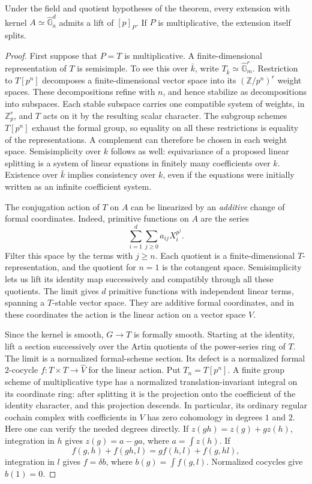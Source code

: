\begin{lemma}
\label{C:formal-vector-splitting}
Under the field and quotient hypotheses of the theorem, every extension
with kernel $A\simeq\widehat{\mathbb G}_a^d$ admits a lift of $[p]_P$.
If $P$ is multiplicative, the extension itself splits.
\end{lemma}
\begin{proof}
First suppose that $P=T$ is multiplicative.  A finite-dimensional
representation of $T$ is semisimple.  To see this over $\bar k$, write
$T_{\bar k}\simeq\widehat{\mathbb G}_m^r$.  Restriction to
$T[p^n]$ decomposes a finite-dimensional vector space into its
$(\mathbb Z/p^n)^r$ weight spaces.  These decompositions refine with
$n$, and hence stabilize as decompositions into subspaces.  Each
stable subspace carries one compatible system of weights, in
$\mathbb Z_p^r$, and $T$ acts on it by the resulting scalar character.
The subgroup schemes $T[p^n]$ exhaust the formal group, so equality on
all these restrictions is equality of the representations.  A
complement can therefore be chosen in each weight space.  Semisimplicity
over $k$ follows as well: equivariance of a proposed linear splitting
is a system of linear equations in finitely many coefficients over
$k$.  Existence over $\bar k$ implies consistency over $k$, even if the
equations were initially written as an infinite coefficient system.

The conjugation action of $T$ on $A$ can be linearized by an
\emph{additive} change of formal coordinates.  Indeed, primitive
functions on $A$ are the series
\[
  \sum_{i=1}^d\sum_{j\geq0} a_{ij}X_i^{p^j}.
\]
Filter this space by the terms with $j\geq n$.  Each quotient is a
finite-dimensional $T$-representation, and the quotient for $n=1$ is
the cotangent space.  Semisimplicity lets us lift its identity map
successively and compatibly through all these quotients.  The limit
gives $d$ primitive functions with independent linear terms, spanning
a $T$-stable vector space.  They are additive formal coordinates, and
in these coordinates the action is the linear action on a vector
space $V$.

Since the kernel is smooth, $G\to T$ is formally smooth.  Starting at
the identity, lift a section successively over the Artin quotients of
the power-series ring of $T$.  The limit is a normalized formal-scheme
section.  Its defect is a normalized formal $2$-cocycle
$f:T\times T\to\widehat V$ for the linear action.  Put $T_n=T[p^n]$.
A finite group scheme of multiplicative type has a normalized
translation-invariant integral on its coordinate ring: after splitting
it is the projection onto the coefficient of the identity character,
and this projection descends.  In particular, its ordinary regular
cochain complex with coefficients in $V$ has zero cohomology in degrees
$1$ and $2$.  Here one can verify the needed degrees directly.  If
$z(gh)=z(g)+g z(h)$, integration in $h$ gives
$z(g)=a-ga$, where $a=\int z(h)$.  If
\[
 f(g,h)+f(gh,l)=g f(h,l)+f(g,hl),
\]
integration in $l$ gives $f=\delta b$, where
$b(g)=\int f(g,l)$.  Normalized cocycles give $b(1)=0$.


\end{proof}

